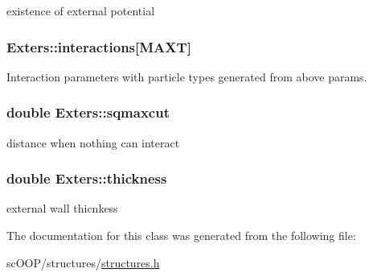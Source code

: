 existence of external potential 

\hypertarget{class_exters_adecb24b99a4014cd45182172733493b7}{
\subsubsection[{interactions}]{ Exters\+::interactions\mbox{[}{\bf M\+A\+X\+T}\mbox{]}}}\label{class_exters_adecb24b99a4014cd45182172733493b7}


Interaction parameters with particle types generated from above params. 

\hypertarget{class_exters_ae4e012e33e40f87ef88b08072bdf2d07}{
\subsubsection[{sqmaxcut}]{\setlength{\rightskip}{0pt plus 5cm}double Exters\+::sqmaxcut}}\label{class_exters_ae4e012e33e40f87ef88b08072bdf2d07}


distance when nothing can interact 

\hypertarget{class_exters_a6ac0235fe365f41ca035957b748c9564}{
\subsubsection[{thickness}]{\setlength{\rightskip}{0pt plus 5cm}double Exters\+::thickness}}\label{class_exters_a6ac0235fe365f41ca035957b748c9564}


external wall thicnkess 



The documentation for this class was generated from the following file\+:\begin{DoxyCompactItemize}
\item 
sc\+O\+O\+P/structures/\hyperlink{structures_8h}{structures.\+h}\end{DoxyCompactItemize}
